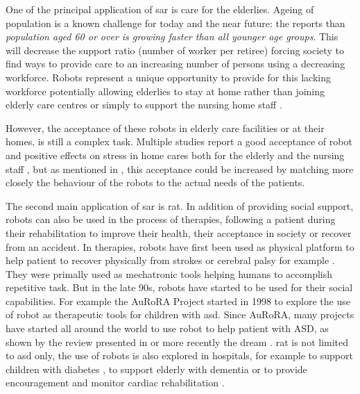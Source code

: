	One of the principal application of \gls{sar} is care for the elderlies. Ageing of population is a known challenge for today and the near future: the \cite{united2017world} reports than \emph{population aged 60 or over is growing faster than all younger age groups}. This will decrease the support ratio (number of worker per retiree) forcing society to find ways to provide care to an increasing number of persons using a decreasing workforce. Robots represent a unique opportunity to provide for this lacking workforce potentially allowing elderlies to stay at home rather than joining elderly care centres \citep{di2014web} or simply to support the nursing home staff \citep{wada2004effects}.
	
	
    However, the acceptance of these robots in elderly care facilities or at their homes, is still a complex task. Multiple studies report a good acceptance of robot and positive effects on stress in home cares both for the elderly and the nursing staff \citep{wada2004effects}, but as mentioned in \citet{broadbent2009acceptance}, this acceptance could be increased by matching more closely the behaviour of the robots to the actual needs of the patients.	
		
	The second main application of \gls{sar} is \gls{rat}. In addition of providing social support, robots can also be used in the process of therapies, following a patient during their rehabilitation to improve their health, their acceptance in society or recover from an accident.     In therapies, robots have first been used as physical platform to help patient to recover physically from strokes or cerebral palsy for example \citep{sivan2011systematic}. They were primally used as mechatronic tools helping humans to accomplish repetitive task. But in the late 90s, robots have started to be used for their social capabilities. For example the AuRoRA Project \citep{dautenhahn1999robots} started in 1998 to explore the use of robot as therapeutic tools for children with \gls{asd}. Since AuRoRA, many projects have started all around the world to use robot to help patient with ASD, as shown by the review presented in \citep{diehl2012clinical} or more recently the \gls{dream} \citep{esteban2017build}. \gls{rat} is not limited to \gls{asd} only, the use of robots is also explored in hospitals, for example to support children with diabetes \citep{belpaeme2012multimodal}, to support elderly with dementia \citep{wada2005psychological} or to provide encouragement and monitor cardiac rehabilitation \citep{lara2017human}.	
	
